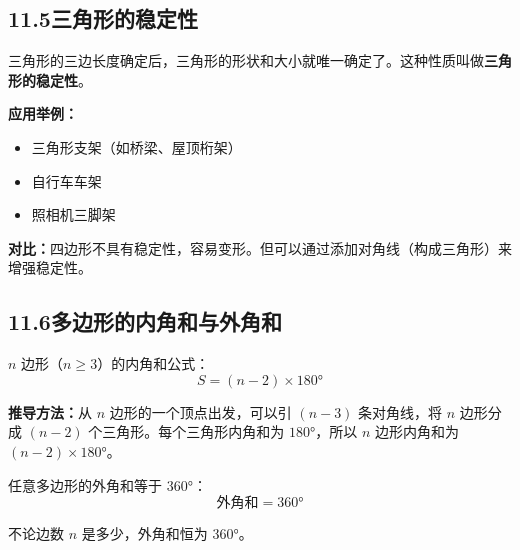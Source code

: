 \documentclass[12pt, a4paper]{ctexart}
\begin{document}
\subsection*{11.5\quad 三角形的稳定性}

\begin{knowledgebox}[三角形的稳定性]
三角形的三边长度确定后，三角形的形状和大小就唯一确定了。这种性质叫做\textbf{三角形的稳定性}。

\textbf{应用举例：}
\begin{itemize}[nosep]
  \item 三角形支架（如桥梁、屋顶桁架）
  \item 自行车车架
  \item 照相机三脚架
\end{itemize}

\textbf{对比：}四边形不具有稳定性，容易变形。但可以通过添加对角线（构成三角形）来增强稳定性。
\end{knowledgebox}

\subsection*{11.6\quad 多边形的内角和与外角和}

\begin{knowledgebox}[多边形的内角和]
$n$ 边形（$n \geqslant 3$）的内角和公式：
\[
\boxed{S = (n - 2) \times 180°}
\]

\textbf{推导方法：}从 $n$ 边形的一个顶点出发，可以引 $(n-3)$ 条对角线，将 $n$ 边形分成 $(n-2)$ 个三角形。每个三角形内角和为 $180°$，所以 $n$ 边形内角和为 $(n-2) \times 180°$。

\begin{center}
\end{center}
\end{knowledgebox}

\begin{knowledgebox}[多边形的外角和]
任意多边形的外角和等于 $360°$：
\[
\boxed{\text{外角和} = 360°}
\]

不论边数 $n$ 是多少，外角和恒为 $360°$。
\end{knowledgebox}
\end{document}
